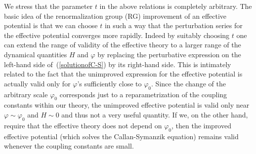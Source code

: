\documentclass[aps,12pt,superscriptaddress,preprintnumbers,
                secnumarabic,nofootinbib,showpacs]{revtex4}
\begin{document}
We stress that the parameter $t$ in the above relations is completely
arbitrary. The basic idea of the renormalization group (RG) improvement
of an effective potential is that we can choose $t$ in such a way that
the perturbation series for the effective potential converges more
rapidly. Indeed by suitably choosing $t$ one can
extend the range of validity of the effective theory to a larger
range of the dynamical quantities $H$ and $\varphi$
by replacing the perturbative expression on the left-hand side
of~(\ref{solutionofC-S}) by its right-hand side. This is intimately related to
the fact that the unimproved expression for the effective
potential is actually valid only for $\varphi$'s sufficiently close
to $\varphi_0$. Since the change of the arbitrary scale $\varphi_0$ corresponds
just to a reparametrization of the coupling constants
within our theory, the unimproved effective potential
is valid only near $\varphi \sim \varphi_0$ and $H\sim 0$
and thus not a very useful quantity. If we, on the other
hand, require that the effective theory does
not depend on $\varphi_0$, then the improved effective potential
(which solves the Callan-Symanzik equation)
remains valid whenever the coupling constants are small.
\end{document}
